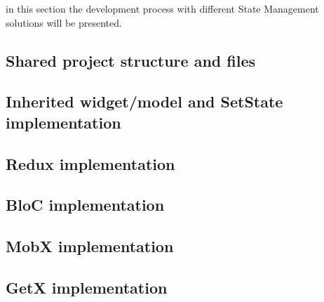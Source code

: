 in this section the development process with different State Management solutions will be presented.

\subsection{Shared project structure and files}
\label{subsec:SharedStructureTodo}


\subsection{Inherited widget/model and SetState implementation}

\subsection{Redux implementation}
\subsection{BloC implementation}
\subsection{MobX implementation}
\subsection{GetX implementation}